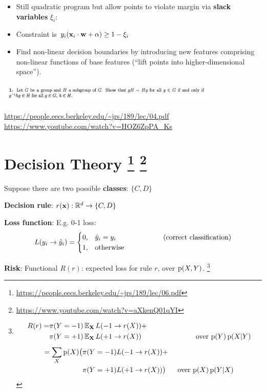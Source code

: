 \documentclass[12pt]{article}
\begin{document}
\begin{itemize}
\item Still quadratic program but allow points to violate margin via
  \textbf{slack variables} $\xi_i$:
\item Constraint is $y_i(\mathbf x_i \cdot \mathbf w + \alpha) \geq 1 - \xi_i$
\item Find non-linear decision boundaries by introducing new features
  comprising non-linear functions of base features (``lift points into
  higher-dimensional space'').
\end{itemize}

\includegraphics[width=300pt]{img/ml-svm-parabolic-lifting.png}

\url{https://people.eecs.berkeley.edu/~jrs/189/lec/04.pdf}\\
\url{https://www.youtube.com/watch?v=HOZ6ZpPA_Ks}


\newpage
\section{Decision Theory
  \footnote{\url{https://people.eecs.berkeley.edu/~jrs/189/lec/06.pdf}}
  \footnote{\url{https://www.youtube.com/watch?v=aXkenQ01qYI}}
}

Suppose there are two possible \textbf{classes}: $\{C, D\}$

\textbf{Decision rule}: $r(\mathbf x): \mathbb{R}^d \to \{C, D\}$

\textbf{Loss function}: E.g. 0-1 loss:
\begin{align*}
  L(y_i \to \hat y_i) =
  \begin{cases}
    0, & \hat y_i = y_i ~~~~~~~~~~~~~~~~~~~~\text{(correct classification)}\\
    1, & \text{otherwise}
  \end{cases}
\end{align*}

\textbf{Risk}: Functional $R(r)$: expected loss for rule $r$, over $\operatorname{\text{p}}(X, Y)$.
\footnote{
\begin{align*}
  R(r) = &\pi(Y=-1)\operatorname{\mathbb{E}}_\mathbf X L(-1 \to r(X)) + \\
         &\pi(Y=+1)\operatorname{\mathbb{E}}_\mathbf X L(+1 \to r(X))~~~~~~~~~~~~~~~~~~~~~~~\text{over $\operatorname{\text{p}}(Y)\operatorname{\text{p}}(X|Y)$}
\end{align*}
\begin{align*}
  = \sum_X \operatorname{\text{p}}(X)\big(&\pi(Y=-1)L(-1 \to r(X)) + \\
                     &\pi(Y=+1)L(+1 \to r(X))\big)~~~~~\text{over $\operatorname{\text{p}}(X)\operatorname{\text{p}}(Y|X)$}
\end{align*}
}
\end{document}
